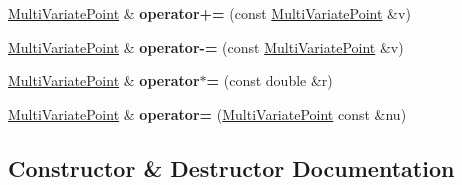 \begin{DoxyCompactItemize}
\item 
\hyperlink{class_multi_variate_point}{Multi\+Variate\+Point} \& {\bfseries operator+=} (const \hyperlink{class_multi_variate_point}{Multi\+Variate\+Point} \&v)\hypertarget{class_multi_variate_point_aa8c0b072bd69e6e5fda6410dfed40f9a}{}\label{class_multi_variate_point_aa8c0b072bd69e6e5fda6410dfed40f9a}

\item 
\hyperlink{class_multi_variate_point}{Multi\+Variate\+Point} \& {\bfseries operator-\/=} (const \hyperlink{class_multi_variate_point}{Multi\+Variate\+Point} \&v)\hypertarget{class_multi_variate_point_aeed522c7d3438f8ce6ee2982383d13c3}{}\label{class_multi_variate_point_aeed522c7d3438f8ce6ee2982383d13c3}

\item 
\hyperlink{class_multi_variate_point}{Multi\+Variate\+Point} \& {\bfseries operator$\ast$=} (const double \&r)\hypertarget{class_multi_variate_point_af2ac0ba60bb5787a3e9d0d7244b358f9}{}\label{class_multi_variate_point_af2ac0ba60bb5787a3e9d0d7244b358f9}

\item 
\hyperlink{class_multi_variate_point}{Multi\+Variate\+Point} \& {\bfseries operator=} (\hyperlink{class_multi_variate_point}{Multi\+Variate\+Point} const \&nu)\hypertarget{class_multi_variate_point_a6cdc125e64fc57bc78e71dbac77e5640}{}\label{class_multi_variate_point_a6cdc125e64fc57bc78e71dbac77e5640}

\end{DoxyCompactItemize}


\subsection{Constructor \& Destructor Documentation}
